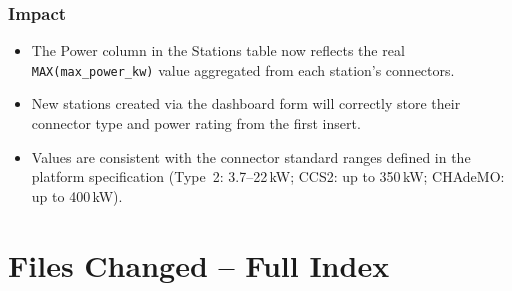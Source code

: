 \documentclass[12pt,a4paper]{report}
\begin{document}
	\subsection*{Impact}
	\begin{itemize}
		\item The Power column in the Stations table now reflects the real
		      \texttt{MAX(max\_power\_kw)} value aggregated from each station's connectors.
		\item New stations created via the dashboard form will correctly store their
		      connector type and power rating from the first insert.
		\item Values are consistent with the connector standard ranges defined in the
		      platform specification (Type~2: 3.7--22\,kW; CCS2: up to 350\,kW;
		      CHAdeMO: up to 400\,kW).
	\end{itemize}

	\chapter{Files Changed -- Full Index}
	
	\setlength{\tabcolsep}{6pt}
	\renewcommand{\arraystretch}{1.4}
	
\end{document}
